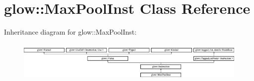 \hypertarget{classglow_1_1_max_pool_inst}{}\section{glow\+:\+:Max\+Pool\+Inst Class Reference}
\label{classglow_1_1_max_pool_inst}
Inheritance diagram for glow\+:\+:Max\+Pool\+Inst\+:\begin{figure}[H]
\begin{center}
\leavevmode
\includegraphics[height=1.991111cm]{classglow_1_1_max_pool_inst}
\end{center}
\end{figure}
